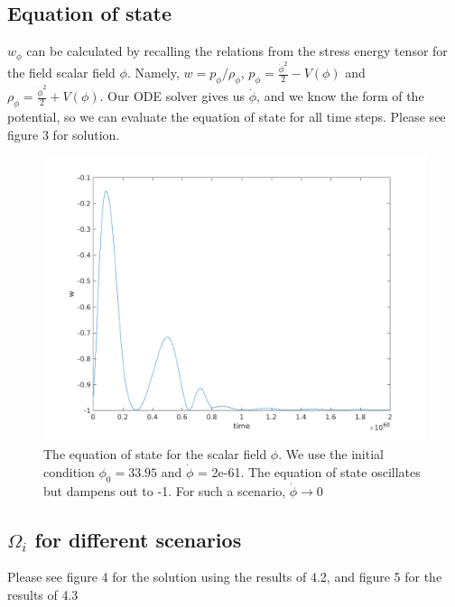 \documentclass[12pt]{article}
\begin{document}
\subsection{Equation of state}

$w_{\phi}$ can be calculated by recalling the relations from the stress energy tensor for the field scalar field $\phi$. Namely, $w = p_{\phi} / \rho_{\phi}$, $p_{\phi} = \frac{\dot{\phi}^2}{2} - V(\phi)$ and $\rho_{\phi} =  \frac{\dot{\phi}^2}{2} + V(\phi)$. Our ODE solver gives us $\dot{\phi}$, and we know the form of the potential, so we can evaluate the equation of state for all time steps. Please see figure 3 for solution.

\begin{figure}
\centering
\includegraphics[width=5in]{eqofstate.png}
\caption{The equation of state for the scalar field $\phi$. We use the initial condition $\phi_{0} = 33.95$ and $\dot{\phi}$ = 2e-61. The equation of state oscillates but dampens out to -1. For such a scenario, $\dot{\phi} \to 0$ }
\end{figure}

\subsection{$\Omega_{i}$ for different scenarios}
Please see figure 4 for the solution using the results of 4.2, and figure 5 for the results of 4.3
\end{document}

